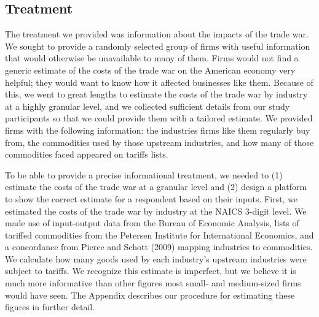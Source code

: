 \documentclass{article}
\begin{document}

\subsection{Treatment}

The treatment we provided was information about the impacts of the trade war. We sought to provide a randomly selected group of firms with useful information that would otherwise be unavailable to many of them. Firms would not find a generic estimate of the costs of the trade war on the American economy very helpful; they would want to know how it affected businesses like them. Because of this, we went to great lengths to estimate the costs of the trade war by industry at a highly granular level, and we collected sufficient details from our study participants so that we could provide them with a tailored estimate. We provided firms with the following information: the industries firms like them regularly buy from, the commodities used by those upstream industries, and how many of those commodities faced appeared on tariffs lists.

To be able to provide a precise informational treatment, we needed to (1) estimate the costs of the trade war at a granular level and (2) design a platform to show the correct estimate for a respondent based on their inputs. First, we estimated the costs of the trade war by industry at the NAICS 3-digit level. We made use of input-output data from the Bureau of Economic Analysis, lists of tariffed commodities from the Petersen Institute for International Economics, and a concordance from Pierce and Schott (2009) mapping industries to commodities. We calculate how many goods used by each industry's upstream industries were subject to tariffs. We recognize this estimate is imperfect, but we believe it is much more informative than other figures most small- and medium-sized firms would have seen. The Appendix describes our procedure for estimating these figures in further detail.
\end{document}
